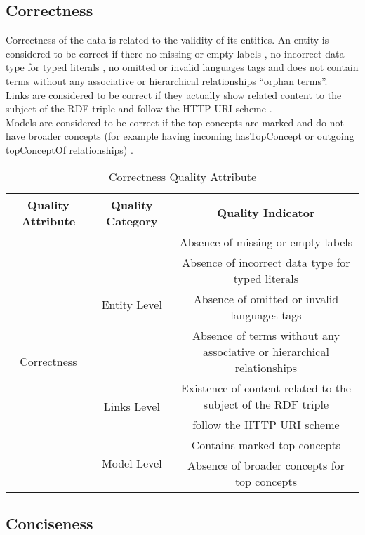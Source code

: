 \documentclass[onecolumn, crcready]{iosart2c}
\begin{document}
\subsection{Correctness}

Correctness of the data is related to the validity of its entities. An entity is considered to be correct if there no missing or empty labels \cite{Acosta2013}\cite{Mader2012}, no incorrect data type for typed literals \cite{Hogan2010}\cite{Acosta2013}, no omitted or invalid languages tags \cite{Suominen:2012:IQS:2413941.2413985}\cite{Mader2012} and does not contain terms without any associative or hierarchical relationships ``orphan terms''\cite{journals/ires/Living10}.\\ Links are considered to be correct if they actually show related content to the subject of the RDF triple \cite{Suominen:2012:IQS:2413941.2413985}\cite{Acosta2013} and follow the HTTP URI scheme \cite{Suominen2013}. \\ Models are considered to be correct if the top concepts are marked and do not have broader concepts (for example having incoming hasTopConcept or outgoing topConceptOf relationships) \cite{Mader2012}.

\begin{table}[h]
\begin{tabular}{|c|c|c|}
\hline 
Quality Attribute & Quality Category & Quality Indicator\tabularnewline
\hline 
\hline 
\multirow{8}{*}{Correctness} & \multirow{4}{*}{Entity Level} & Absence of missing or empty labels\tabularnewline
\cline{3-3} 
 &  & Absence of incorrect data type for typed literals \tabularnewline
\cline{3-3} 
 &  & Absence of omitted or invalid languages tags \tabularnewline
\cline{3-3} 
 &  & Absence of terms without any associative or hierarchical relationships\tabularnewline
\cline{2-3} 
 & \multirow{2}{*}{Links Level} & Existence of content related to the subject of the RDF triple\tabularnewline
\cline{3-3} 
 &  & follow the HTTP URI scheme\tabularnewline
\cline{2-3} 
 & \multirow{2}{*}{Model Level} & Contains marked top concepts\tabularnewline
\cline{3-3} 
 &  & Absence of broader concepts for top concepts\tabularnewline
\hline 
\end{tabular}\caption{Correctness Quality Attribute}
\end{table}

\subsection{Conciseness}
\end{document}
